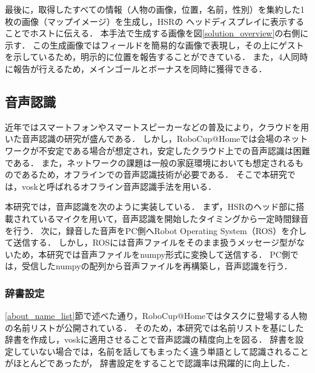 \documentclass[a4j]{jarticle}
\begin{document}
最後に，取得したすべての情報（人物の画像，位置，名前，性別）を集約した1枚の画像（マップイメージ）を生成し，HSRの
ヘッドディスプレイに表示することでホストに伝える．
本手法で生成する画像を図\ref{solution_overview}の右側に示す．
この生成画像ではフィールドを簡易的な画像で表現し，その上にゲストを示しているため，明示的に位置を報告することができている．
また，4人同時に報告が行えるため，メインゴールとボーナスを同時に獲得できる．

\subsection{音声認識}
近年ではスマートフォンやスマートスピーカーなどの普及により，クラウドを用いた音声認識の研究が盛んである\cite{google_speech_api, amazon_speech_api}．
しかし，RoboCup@Homeでは会場のネットワークが不安定である場合が想定され，安定したクラウド上での音声認識は困難である．
また，ネットワークの課題は一般の家庭環境においても想定されるものであるため，オフラインでの音声認識技術が必要である．
そこで本研究では，vosk\cite{vosk_hp}と呼ばれるオフライン音声認識手法を用いる．

本研究では，音声認識を次のように実装している．
まず，HSRのヘッド部に搭載されているマイクを用いて，音声認識を開始したタイミングから一定時間録音を行う．
次に，録音した音声をPC側へRobot Operating System（ROS）\cite{ros_wiki}を介して送信する．
しかし，ROSには音声ファイルをそのまま扱うメッセージ型がないため，本研究では音声ファイルをnumpy形式に変換して送信する．
PC側では，受信したnumpyの配列から音声ファイルを再構築し，音声認識を行う．

\subsubsection{辞書設定}
\ref{about_name_list}節で述べた通り，RoboCup@Homeではタスクに登場する人物の名前リストが公開されている．
そのため，本研究では名前リストを基にした辞書を作成し，voskに適用させることで音声認識の精度向上を図る．
辞書を設定していない場合では，名前を話してもまったく違う単語として認識されることがほとんどであったが，
辞書設定をすることで認識率は飛躍的に向上した．
\end{document}
